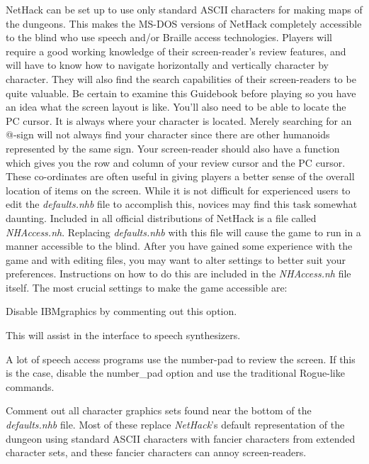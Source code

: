 NetHack can be set up to use only standard ASCII characters for making
maps of the dungeons. This makes the MS-DOS versions of NetHack completely
accessible to the blind who use speech and/or Braille access technologies.
Players will require a good working knowledge of their screen-reader's
review features, and will have to know how to navigate horizontally and
vertically character by character. They will also find the search
capabilities of their screen-readers to be quite valuable. Be certain to
examine this Guidebook before playing so you have an idea what the screen
layout is like. You'll also need to be able to locate the PC cursor. It is
always where your character is located. Merely searching for an @-sign will
not always find your character since there are other humanoids represented
by the same sign. Your screen-reader should also have a function which
gives you the row and column of your review cursor and the PC cursor.
These co-ordinates are often useful in giving players a better sense of the
overall location of items on the screen.
While it is not difficult for experienced users to edit the {\it defaults.nhb\/}
file to accomplish this, novices may find this task somewhat daunting.
Included in all official distributions of NetHack is a file called
{\it NHAccess.nh\/}.  Replacing {\it defaults.nhb\/} with this file will cause
the game to run in a manner accessible to the blind. After you have gained
some experience with the game and with editing files, you may want to alter
settings to better suit your preferences. Instructions on how to do this
are included in the {\it NHAccess.nh\/} file itself. The most crucial
settings to make the game accessible are:
\blist{}
\item[\ib{IBMgraphics}]
Disable IBMgraphics by commenting out this option.
\item[\ib{menustyle:traditional}]
This will assist in the interface to speech synthesizers.
\item[\ib{number\_pad}]
A lot of speech access programs use the number-pad to review the screen.
If this is the case, disable the number\_pad option and use the traditional
Rogue-like commands.
\item[\ib{Character graphics}]
Comment out all character graphics sets found near the bottom of the
{\it defaults.nhb\/} file.  Most of these replace {\it NetHack\/}'s
default representation of the dungeon using standard ASCII characters
with fancier characters from extended character sets, and these fancier
characters can annoy screen-readers.
\elist

